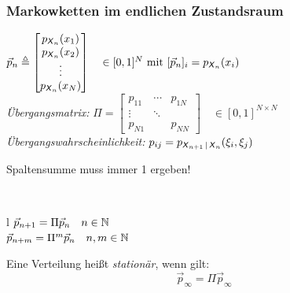 \documentclass[german,color,6pt]{latex4ei/latex4ei_sheet}
\begin{document}
\begin{sectionbox}
	\subsubsection{Markowketten im endlichen Zustandsraum}
	$\vec{p}_{n} \triangleq \begin{bmatrix} p_{\operatorname{\textsf{\textit{X}}}_{n}}(x_{1}) \\ p_{\operatorname{\textsf{\textit{X}}}_{n}}(x_{2}) \\ \vdots \\ p_{\operatorname{\textsf{\textit{X}}}_{n}}(x_{N}) \end{bmatrix} \quad \in [0,1]^{N}\text{ mit }[\vec{p}_{n}]_{i} = p_{\operatorname{\textsf{\textit{X}}}_{n}}(x_{i})$ \\
	\emph{Übergangsmatrix:}
	 $\Pi = \begin{bmatrix} p_{11} & \cdots & p_{1N} \\ \vdots & \ddots &   \\ p_{N1} & & p_{NN} \end{bmatrix} \quad \in [0,1]^{N \times N}$\\

	 \emph{Übergangswahrscheinlichkeit:} $p_{ij} = p_{\operatorname{\textsf{\textit{X}}}_{n+1}|\operatorname{\textsf{\textit{X}}}_n}(\xi_i,\xi_j)$ \\
	 \centerline{Spaltensumme muss immer 1 ergeben!}\\
	 \begin{tablebox}{l}
		 $\vec{p}_{n+1}  = \Pi \vec{p}_{n} \quad n \in \operatorname{\mathbb N}$ \\
		 $\vec{p}_{n+m}  = \Pi^{m} \vec{p}_{n} \quad n, m \in \operatorname{\mathbb N}$
	 \end{tablebox}
	 Eine Verteilung heißt \emph{stationär}, wenn gilt:\\
	\[\vec{p}_{\infty}  = \Pi \vec{p}_{\infty} \]
\end{sectionbox}


\end{document}
